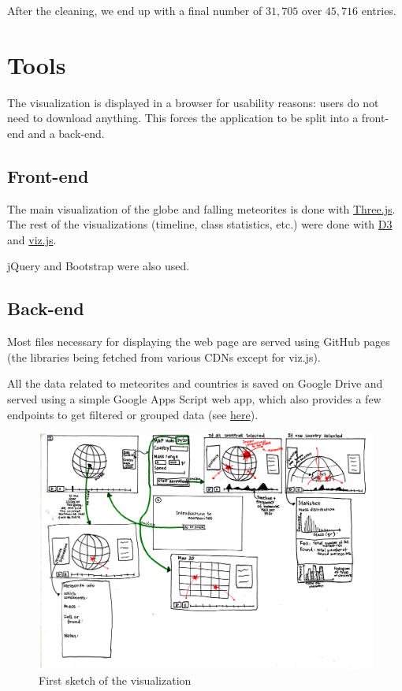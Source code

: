 \documentclass[10pt,conference,compsocconf]{IEEEtran}
\begin{document}
After the cleaning, we end up with a final number of $31,705$ over $45,716$ entries.

\section{Tools}
\label{sec:tools}

The visualization is displayed in a browser for usability reasons: users do not need to download anything. This forces the application to be split into a front-end and a back-end.

\subsection{Front-end}

The main visualization of the globe and falling meteorites is done with \href{https://threejs.org/}{Three.js}.
The rest of the visualizations (timeline, class statistics, etc.) were done with \href{https://d3js.org/}{D3} and \href{http://vizjs.org/}{viz.js}.

jQuery and Bootstrap were also used.

\subsection{Back-end}

Most files necessary for displaying the web page are served using GitHub pages (the libraries being fetched from various CDNs except for viz.js).

All the data related to meteorites and countries is saved on Google Drive and served using a simple Google Apps Script web app, which also provides a few endpoints to get filtered or grouped data (see \href{https://github.com/RajaSoufi/GeoMeteorites/tree/master/gds-doc#google-drive-server-documentation}{here}).
\begin{figure}[]
  \centering
  \includegraphics[angle=-90,width=0.9\linewidth]{images/sketch1.jpg}
  \vspace{-3mm}
  \caption{First sketch of the visualization}
  \label{fig:sketch1}
\end{figure}
\end{document}
